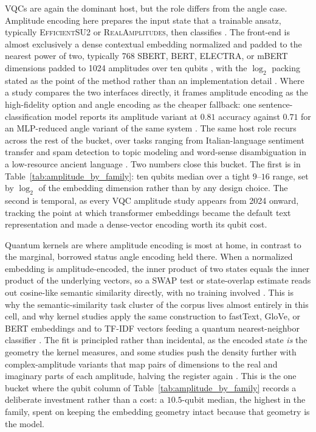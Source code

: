 \documentclass{ieeeaccess}
\begin{document}
VQCs are again the dominant host, but the role differs from the angle case. Amplitude encoding here prepares the input state that a trainable ansatz, typically \textsc{EfficientSU2} or \textsc{RealAmplitudes}, then classifies \cite{korrapati_quantum_2025}. The front-end is almost exclusively a dense contextual embedding normalized and padded to the nearest power of two, typically 768 SBERT, BERT, ELECTRA, or mBERT dimensions padded to 1024 amplitudes over ten qubits \cite{guarasci_applying_2025,buonaiuto_quantum_2024,buonaiuto_multilingual_2025}, with the $\log_2$ packing stated as the point of the method rather than an implementation detail \cite{liu_hcqnsc_2026}. Where a study compares the two interfaces directly, it frames amplitude encoding as the high-fidelity option and angle encoding as the cheaper fallback: one sentence-classification model reports its amplitude variant at $0.81$ accuracy against $0.71$ for an MLP-reduced angle variant of the same system \cite{guarasci_applying_2025}. The same host role recurs across the rest of the bucket, over tasks ranging from Italian-language sentiment transfer and spam detection to topic modeling and word-sense disambiguation in a low-resource ancient language \cite{amsaveni_qesan_2025,buonaiuto_quantum_2024-1,pandey_quantum_2024,qiao_quantum_2024,shahriyar_toward_2025,isea_using_2026}. Two numbers close this bucket. The first is in Table~\ref{tab:amplitude_by_family}: ten qubits median over a tight $9$--$16$ range, set by $\log_2$ of the embedding dimension rather than by any design choice. The second is temporal, as every VQC amplitude study appears from 2024 onward, tracking the point at which transformer embeddings became the default text representation and made a dense-vector encoding worth its qubit cost.

Quantum kernels are where amplitude encoding is most at home, in contrast to the marginal, borrowed status angle encoding held there. When a normalized embedding is amplitude-encoded, the inner product of two states equals the inner product of the underlying vectors, so a SWAP test or state-overlap estimate reads out cosine-like semantic similarity directly, with no training involved \cite{cavar_old_2026,cavar_word_2025,cavar_semantic_2024}. This is why the semantic-similarity task cluster of the corpus lives almost entirely in this cell, and why kernel studies apply the same construction to fastText, GloVe, or BERT embeddings and to TF-IDF vectors feeding a quantum nearest-neighbor classifier \cite{alexander_quantum_2022,zeguendry_quantum_2024}. The fit is principled rather than incidental, as the encoded state \emph{is} the geometry the kernel measures, and some studies push the density further with complex-amplitude variants that map pairs of dimensions to the real and imaginary parts of each amplitude, halving the register again \cite{cavar_old_2026}. This is the one bucket where the qubit column of Table~\ref{tab:amplitude_by_family} records a deliberate investment rather than a cost: a $10.5$-qubit median, the highest in the family, spent on keeping the embedding geometry intact because that geometry is the model.
\end{document}
